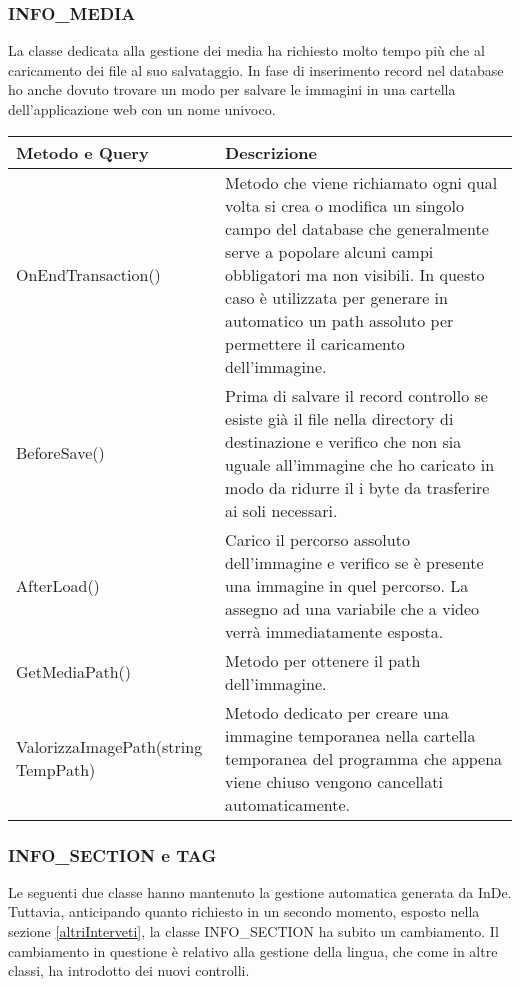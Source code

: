 \subsubsection{INFO\_MEDIA}
La classe dedicata alla gestione dei media ha richiesto molto tempo più che al caricamento dei file al suo salvataggio. In fase di inserimento record nel database ho anche dovuto trovare un modo per salvare le immagini in una cartella dell'applicazione web con un nome univoco.
\begin{center}
	\begin{tabular}{ p{}|p{8cm} }
		\hline
		\textbf{Metodo e Query} & \textbf{Descrizione}\\
		\hline
		OnEndTransaction() & Metodo che viene richiamato ogni qual volta si crea o modifica un singolo campo del database che generalmente serve a popolare alcuni campi obbligatori ma non visibili. In questo caso è utilizzata per generare in automatico un path assoluto per permettere il caricamento dell'immagine. \\
		\hline
		BeforeSave()	& Prima di salvare il record controllo se esiste già il file nella directory di destinazione e verifico che non sia uguale all'immagine che ho caricato in modo da ridurre il i byte da trasferire ai soli necessari.\\
		\hline
		AfterLoad()	& Carico il percorso assoluto dell'immagine e verifico se è presente una immagine in quel percorso. La assegno ad una variabile che a video verrà immediatamente esposta.\\
		\hline
		GetMediaPath()& Metodo per ottenere il path dell'immagine.\\
		\hline
		ValorizzaImagePath(string TempPath)	& Metodo dedicato per creare una immagine temporanea nella cartella temporanea del programma che appena viene chiuso vengono cancellati automaticamente.\\
	
	\end{tabular}
\end{center}

\subsubsection{INFO\_SECTION e TAG}
Le seguenti due classe hanno mantenuto la gestione automatica generata da InDe. Tuttavia, anticipando quanto richiesto in un secondo momento, esposto nella sezione \ref{altriInterveti}, la classe INFO\_SECTION ha subito un cambiamento. Il cambiamento in questione è relativo alla gestione della lingua, che come in altre classi, ha introdotto dei nuovi controlli.

